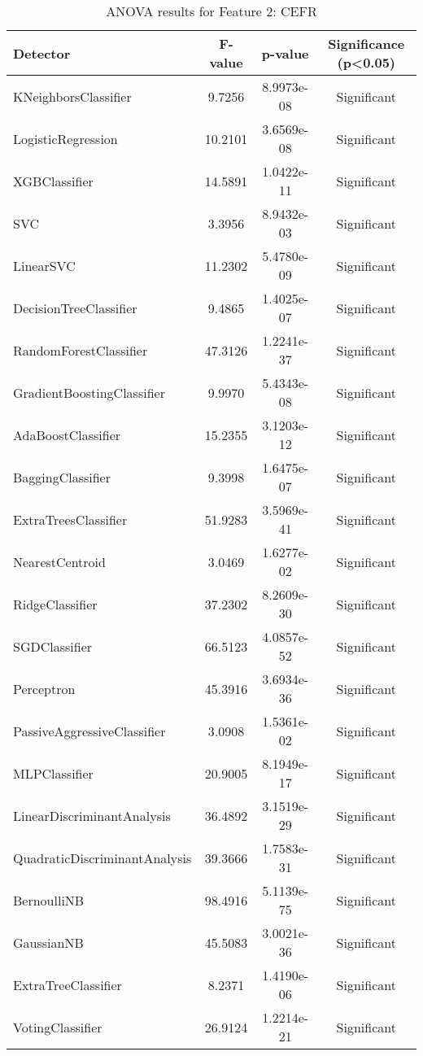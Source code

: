 \begin{table*}[htbp]
\centering
\small
\begin{tabular}{lccc}
\toprule
\textbf{Detector} & \textbf{F-value} & \textbf{p-value} & \textbf{Significance (p<0.05)} \\
\midrule
KNeighborsClassifier           & 9.7256   & 8.9973e-08   & Significant \\
LogisticRegression             & 10.2101  & 3.6569e-08   & Significant \\
XGBClassifier                  & 14.5891  & 1.0422e-11   & Significant \\
SVC                            & 3.3956   & 8.9432e-03   & Significant \\
LinearSVC                      & 11.2302  & 5.4780e-09   & Significant \\
DecisionTreeClassifier         & 9.4865   & 1.4025e-07   & Significant \\
RandomForestClassifier         & 47.3126  & 1.2241e-37   & Significant \\
GradientBoostingClassifier     & 9.9970   & 5.4343e-08   & Significant \\
AdaBoostClassifier             & 15.2355  & 3.1203e-12   & Significant \\
BaggingClassifier              & 9.3998   & 1.6475e-07   & Significant \\
ExtraTreesClassifier           & 51.9283  & 3.5969e-41   & Significant \\
NearestCentroid                & 3.0469   & 1.6277e-02   & Significant \\
RidgeClassifier                & 37.2302  & 8.2609e-30   & Significant \\
SGDClassifier                  & 66.5123  & 4.0857e-52   & Significant \\
Perceptron                     & 45.3916  & 3.6934e-36   & Significant \\
PassiveAggressiveClassifier    & 3.0908   & 1.5361e-02   & Significant \\
MLPClassifier                  & 20.9005  & 8.1949e-17   & Significant \\
LinearDiscriminantAnalysis     & 36.4892  & 3.1519e-29   & Significant \\
QuadraticDiscriminantAnalysis  & 39.3666  & 1.7583e-31   & Significant \\
BernoulliNB                    & 98.4916  & 5.1139e-75   & Significant \\
GaussianNB                     & 45.5083  & 3.0021e-36   & Significant \\
ExtraTreeClassifier            & 8.2371   & 1.4190e-06   & Significant \\
VotingClassifier               & 26.9124  & 1.2214e-21   & Significant \\
\bottomrule
\end{tabular}
\caption{ANOVA results for Feature 2: CEFR}
\end{table*}

